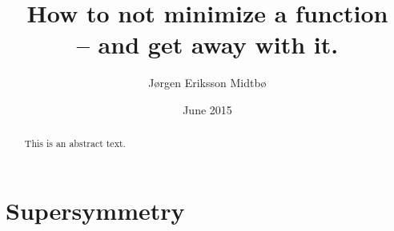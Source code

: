 \documentclass[twoside,english]{uiofysmaster}
\author{J\o rgen Eriksson Midtb\o}
\title{How to not minimize a function \\
-- and get away with it.}
\date{June 2015}
\begin{document}
\lstset{language=Python}


\cleardoublepage

\begin{abstract}
This is an abstract text.
\end{abstract}



\tableofcontents
\listoffigures
\listoftables


\chapter{Supersymmetry}

\end{document}
